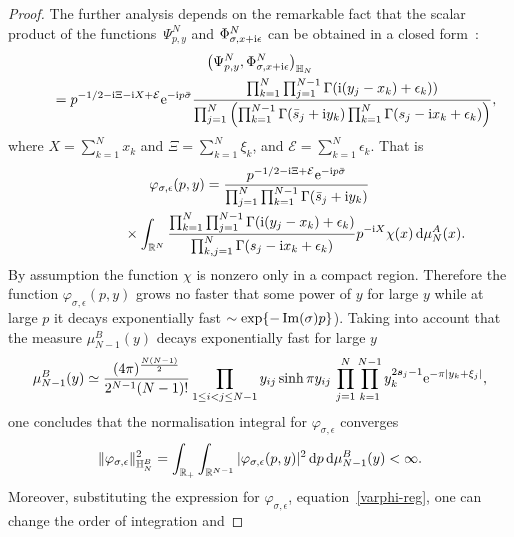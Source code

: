 \documentclass[pdftex]{sigma}%
\numberwithin{equation}{section}
\begin{document}
\begin{proof}
The further analysis depends on the remarkable fact that the scalar product of the func\-ti\-ons~$\Psi^N_{p,y}$ and
$\Phi^N_{\sigma,x+{\rm i}\epsilon}$ can be obtained in a closed form~\cite{Belitsky:2014rba}:
\begin{gather}
\big(\Psi^N_{p, y},\Phi^N_{\sigma,x+{\rm i}\epsilon}\big)_{\mathbb H_N} \nonumber
\\ \qquad
{}=p^{-1/2 -{\rm i}\Xi-{\rm i}X+\mathcal E}{\rm e}^{-{\rm i}p\bar\sigma}\frac{
\prod_{k=1}^N\prod_{j=1}^{N-1} \Gamma({\rm i}(y_j-x_k)+\epsilon_k))
}{\prod_{j=1}^N\left(\prod_{k=1}^{N-1}\Gamma( \bar s_j+{\rm i}y_k)\prod_{k=1}^{N}\Gamma( s_j-{\rm i}x_k+\epsilon_k)\right)},\label{BtoA}
\end{gather}
where $X=\sum_{k=1}^N x_k$ and $\Xi=\sum_{k=1}^N \xi_k$, and $\mathcal E=\sum_{k=1}^N \epsilon_k$. That is
\begin{gather}
\varphi_{\sigma,\epsilon}(p,y)=\frac{p^{-1/2 -{\rm i}\Xi+\mathcal E}{\rm e}^{-{\rm i}p\bar\sigma}}{\prod_{j=1}^N\prod_{k=1}^{N-1}\Gamma( \bar s_j+{\rm i}y_k)}\nonumber
\\ \hphantom{\varphi_{\sigma,\epsilon}(p,y)=}
{}\times\int_{\mathbb R^N}\frac{
\prod_{k=1}^N\prod_{j=1}^{N-1} \Gamma({\rm i}(y_j-x_k)+\epsilon_k)}{\prod_{k,j=1}^{N}\Gamma( s_j-{\rm i}x_k+\epsilon_k)}
 p^{-{\rm i}X} \chi(x)\,{\rm d}\mu_N^A(x). \label{varphi-reg}
\end{gather}
By assumption the function $\chi$ is nonzero only in a compact region. Therefore the function $\varphi_{\sigma,\epsilon}(p,y)$ grows no
faster that some power of $y$ for large $y$ while at large $p$ it decays exponentially fast $\sim \exp\{-\mathop{\rm Im}(\sigma)p\}$). Taking
into account that the measure $\mu_{N-1}^{B}(y)$ decays exponentially fast for large $y$
\begin{gather*}
\mu^B_{N-1}(y) \simeq \frac{(4\pi)^{\frac{N(N-1)}2} }{2^{N-1} (N-1)!}
\prod_{1\leq i<j\leq N-1} {y_{ij}}\sinh\pi y_{ij}\, \prod_{j=1}^N\prod_{k=1}^{N-1} y_k^{2\boldsymbol s_j-1} {\rm e}^{-\pi |y_k+\xi_j|},
\end{gather*}
one concludes that the normalisation integral for $\varphi_{\sigma,\epsilon}$ converges
\begin{gather*}
\|\varphi_{\sigma,\epsilon}\|^2_{\mathbb H_N^B}=\int_{\mathbb R_+}\int_{\mathbb R^{N-1}}
 |\varphi_{\sigma,\epsilon}(p,y)|^2 \,{\rm d}p \,{\rm d}\mu_{N-1}^{B}(y) < \infty.
\end{gather*}
Moreover, substituting the expression for $\varphi_{\sigma,\epsilon}$, equation~\eqref{varphi-reg}, one can change the order of integration and

\end{proof}
\end{document}
